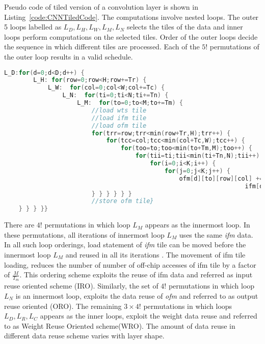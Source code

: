 Pseudo code of tiled version of a convolution layer is shown in Listing~\ref{code:CNNTiledCode}. The computations involve nested loops. The outer 5 loops labelled as $L_D,L_H,L_W,L_M,L_N$ selects the tiles of the data and inner loops perform computations on the selected tiles. Order of the outer loops decide the sequence in which different tiles are processed. Each of the $5!$ permutations of the outer loop results in a valid schedule. 
\begin{lstlisting}[float,language=C,label=code:CNNTiledCode,caption=Pseudo code of a tiled convolution layer,captionpos=b,belowskip=-1 \baselineskip,breakautoindent=true, breakindent=108pt, breaklines]
	L_D:for(d=0;d<D;d++) {
		L_H: for(row=0;row<H;row+=Tr) {
			L_W:  for(col=0;col<W;col+=Tc) {
				L_N:  for(ti=0;ti<N;ti+=Tn) {
					L_M:  for(to=0;to<M;to+=Tm) {
						//load wts tile
						//load ifm tile
						//load ofm tile
						for(trr=row;trr<min(row+Tr,H);trr++) {
							for(tcc=col;tcc<min(col+Tc,W);tcc++) {
								for(too=to;too<min(to+Tm,M);too++) {
									for(tii=ti;tii<min(ti+Tn,N);tii++) {
										for(i=0;i<K;i++) {
											for(j=0;j<K;j++) {
												ofm[d][to][row][col] += weights[to][ti][i][j] * 
												                  ifm[d][ti][S*row+i][S*col+j];
						} } } } } }
						//store ofm tile}
	} } } }}
\end{lstlisting}
There are $4!$ permutations in which loop $L_M$ appears as the innermost loop. In these permutations, all iterations of innermost loop $L_M$ uses the same \textit{ifm} data. In all such loop orderings, load statement of \textit{ifm} tile can be moved before the innermost loop $L_M$ and reused in all its iterations \cite{zhang2015optimizing}. The movement of ifm tile loading, reduces the number of number of off-chip accesses of ifm tile by a factor of $\frac{M}{T_m}$. This ordering scheme exploits the reuse of ifm data and referred as input reuse oriented scheme (IRO). Similarly, the set of $4!$ permutations in which loop $L_N$ is an innermost loop, exploits the data reuse of \textit{ofm} and referred to as output reuse oriented (ORO). The remaining $3\times 4!$ permutations in which loops $L_D,L_R,L_C$ appears as the inner loops, exploit the weight data reuse and referred to as Weight Reuse Oriented scheme(WRO). The amount of data reuse in different data reuse scheme varies with layer shape. 

